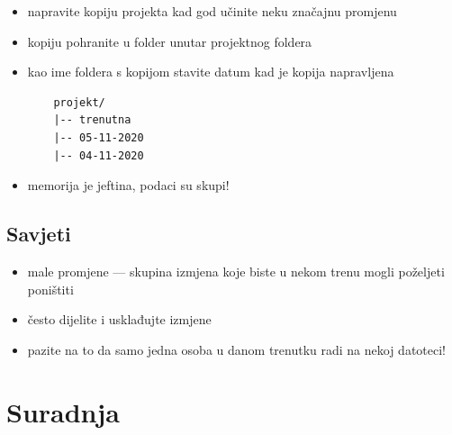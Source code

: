 \documentclass[aspectratio=169]{beamer}
\begin{document}
\begin{frame}[fragile]
    \begin{itemize}
        \setlength{\itemsep}{2em}

        \item napravite kopiju projekta kad god učinite neku značajnu promjenu

        \pause

        \item kopiju pohranite u folder unutar projektnog foldera

        \item kao ime foldera s kopijom stavite datum kad je kopija napravljena

        \pause

        \begin{lstlisting}
    projekt/
    |-- trenutna
    |-- 05-11-2020
    |-- 04-11-2020
        \end{lstlisting}

        \pause

        \item memorija je jeftina, podaci su skupi!
    \end{itemize}
\end{frame}

\subsection{Savjeti}

\begin{frame}
    \begin{itemize}
        \setlength{\itemsep}{2em}

        \item male promjene --- skupina izmjena koje biste u nekom trenu
            mogli poželjeti poništiti

        \pause

        \item često dijelite i usklađujte izmjene

        \pause

        \item pazite na to da samo jedna osoba u danom trenutku radi na nekoj
            datoteci!
    \end{itemize}
\end{frame}

\section{Suradnja}
\end{document}
